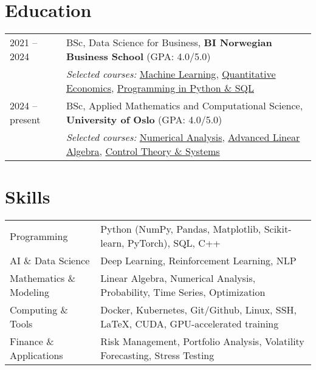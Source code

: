 \documentclass[a4paper,10pt]{article}
\begin{document}
\section{Education}
\begin{tabularx}{\linewidth}{@{}l X@{}}

2021 -- 2024 & 
BSc, Data Science for Business, \textbf{BI Norwegian Business School} 
\hfill (GPA: 4.0/5.0) \\
& \textit{Selected courses:} 
\href{https://programmeinfo.bi.no/en/course/EBA-3530/2023-spring}{Machine Learning}, 
\href{https://programmeinfo.bi.no/nb/course/EBA-3650/2024-spring}{Quantitative Economics}, 
\href{https://programmeinfo.bi.no/nb/course/EBA-3420/2022-spring}{Programming in Python \& SQL} \\[1ex]

2024 -- present & 
BSc, Applied Mathematics and Computational Science, \textbf{University of Oslo} 
\hfill (GPA: 4.0/5.0) \\
& \textit{Selected courses:} 
\href{https://www.uio.no/studier/emner/matnat/math/MAT3110/h25/index.html}{Numerical Analysis}, 
\href{https://www.uio.no/studier/emner/matnat/math/MAT1125/h25/index.html}{Advanced Linear Algebra}, 
\href{https://www.uio.no/studier/emner/matnat/its/TEK4090/h25/index.html}{Control Theory \& Systems} \\

\end{tabularx}




\section{Skills}
\begin{tabularx}{\linewidth}{@{}l X@{}}
Programming & Python (NumPy, Pandas, Matplotlib, Scikit-learn, PyTorch), SQL, C++ \\
AI \& Data Science & Deep Learning, Reinforcement Learning, NLP \\
Mathematics \& Modeling & Linear Algebra, Numerical Analysis, Probability, Time Series, Optimization \\
Computing \& Tools & Docker, Kubernetes, Git/Github, Linux, SSH, LaTeX, CUDA, GPU-accelerated training \\
Finance \& Applications & Risk Management, Portfolio Analysis, Volatility Forecasting, Stress Testing \\
\end{tabularx}

\vfill
{}
\end{document}
